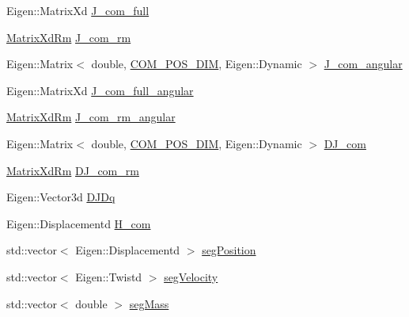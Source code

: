 \begin{DoxyCompactItemize}
\item 
\-Eigen\-::\-Matrix\-Xd \hyperlink{structOcraWbiModel_1_1OcraWbiModel__pimpl_a73c9391019a2e36ddd2c2f9ef1773a41}{\-J\-\_\-com\-\_\-full}
\item 
\hyperlink{namespaceocra__icub_aa5e36a19ed031c28ca83c207bd7dd83f}{\-Matrix\-Xd\-Rm} \hyperlink{structOcraWbiModel_1_1OcraWbiModel__pimpl_a58b26a33ee0449f71a3d338c23ea29d5}{\-J\-\_\-com\-\_\-rm}
\item 
\-Eigen\-::\-Matrix$<$ double, \*
\hyperlink{OcraWbiModel_8cpp_a72cb22de2538ae949cc73fa3d7c33bdc}{\-C\-O\-M\-\_\-\-P\-O\-S\-\_\-\-D\-I\-M}, \-Eigen\-::\-Dynamic $>$ \hyperlink{structOcraWbiModel_1_1OcraWbiModel__pimpl_a1755993b2e425c6a49c55874c6c455e4}{\-J\-\_\-com\-\_\-angular}
\item 
\-Eigen\-::\-Matrix\-Xd \hyperlink{structOcraWbiModel_1_1OcraWbiModel__pimpl_ac064807ab1c8a89585cb7aa5f49d8744}{\-J\-\_\-com\-\_\-full\-\_\-angular}
\item 
\hyperlink{namespaceocra__icub_aa5e36a19ed031c28ca83c207bd7dd83f}{\-Matrix\-Xd\-Rm} \hyperlink{structOcraWbiModel_1_1OcraWbiModel__pimpl_ad52987f0908ab1b44779e3d752a7b97b}{\-J\-\_\-com\-\_\-rm\-\_\-angular}
\item 
\-Eigen\-::\-Matrix$<$ double, \*
\hyperlink{OcraWbiModel_8cpp_a72cb22de2538ae949cc73fa3d7c33bdc}{\-C\-O\-M\-\_\-\-P\-O\-S\-\_\-\-D\-I\-M}, \-Eigen\-::\-Dynamic $>$ \hyperlink{structOcraWbiModel_1_1OcraWbiModel__pimpl_a38a8628ca93524e08beada55f455249b}{\-D\-J\-\_\-com}
\item 
\hyperlink{namespaceocra__icub_aa5e36a19ed031c28ca83c207bd7dd83f}{\-Matrix\-Xd\-Rm} \hyperlink{structOcraWbiModel_1_1OcraWbiModel__pimpl_a864b4ce170b3526fba0f7e832bfbb2d8}{\-D\-J\-\_\-com\-\_\-rm}
\item 
\-Eigen\-::\-Vector3d \hyperlink{structOcraWbiModel_1_1OcraWbiModel__pimpl_accd197872291c3e90272b8ebd87cefc8}{\-D\-J\-Dq}
\item 
\-Eigen\-::\-Displacementd \hyperlink{structOcraWbiModel_1_1OcraWbiModel__pimpl_a5e031088136b048a403c9df06e62c2b8}{\-H\-\_\-com}
\item 
std\-::vector$<$ \-Eigen\-::\-Displacementd $>$ \hyperlink{structOcraWbiModel_1_1OcraWbiModel__pimpl_a47b0a577b990fa7db3bc04a7a8107c31}{seg\-Position}
\item 
std\-::vector$<$ \-Eigen\-::\-Twistd $>$ \hyperlink{structOcraWbiModel_1_1OcraWbiModel__pimpl_a6e95ae9d994aa67c9a2fc4021f80bb54}{seg\-Velocity}
\item 
std\-::vector$<$ double $>$ \hyperlink{structOcraWbiModel_1_1OcraWbiModel__pimpl_a6cdb912e87fd9cea517e098615c8f945}{seg\-Mass}

\end{DoxyCompactItemize}
